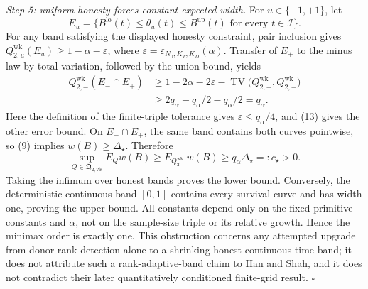 \emph{Step 5: uniform honesty forces constant expected width.}
For \(u\in\{-1,+1\}\), let
\[
 E_u=\{B^{\mathrm{lo}}(t)\le\theta_u(t)\le B^{\mathrm{up}}(t)
       \text{ for every }t\in\mathcal I\}.
\]
For any band satisfying the displayed honesty constraint, pair inclusion
gives
\(Q_{2,u}^{\mathrm{wk}}(E_u)\ge1-\alpha-\varepsilon\), where
\(\varepsilon=\varepsilon_{N_0,K_T,K_D}(\alpha)\).  Transfer of
\(E_+\) to the minus law by total variation, followed by the union bound,
yields
\[
 \begin{aligned}
 Q_{2,-}^{\mathrm{wk}}(E_-\cap E_+)
 &\ge1-2\alpha-2\varepsilon
      -\operatorname{TV}
       \bigl(Q_{2,+}^{\mathrm{wk}},Q_{2,-}^{\mathrm{wk}}\bigr)\\
 &\ge2q_\alpha-q_\alpha/2-q_\alpha/2=q_\alpha.       \tag{14}
 \end{aligned}
\]
Here the definition of the finite-triple tolerance gives
\(\varepsilon\le q_\alpha/4\), and (13) gives the other error bound.
On \(E_-\cap E_+\), the same band contains both curves pointwise, so (9)
implies \(w(B)\ge\Delta_\star\).  Therefore
\[
 \sup_{Q\in\mathfrak Q_{2,\mathrm{vis}}}E_Qw(B)
 \ge E_{Q_{2,-}^{\mathrm{wk}}}w(B)
 \ge q_\alpha\Delta_\star=:c_\star>0.                \tag{15}
\]
Taking the infimum over honest bands proves the lower bound.  Conversely,
the deterministic continuous band \([0,1]\) contains every survival curve
and has width one, proving the upper bound.  All constants depend only on
the fixed primitive constants and \(\alpha\), not on the sample-size
triple or its relative growth.  Hence the minimax order is exactly one.
This obstruction concerns any attempted upgrade from donor rank detection
alone to a shrinking honest continuous-time band; it does not attribute
such a rank-adaptive-band claim to Han and Shah, and it does not contradict
their later quantitatively conditioned finite-grid result. \(\square\)